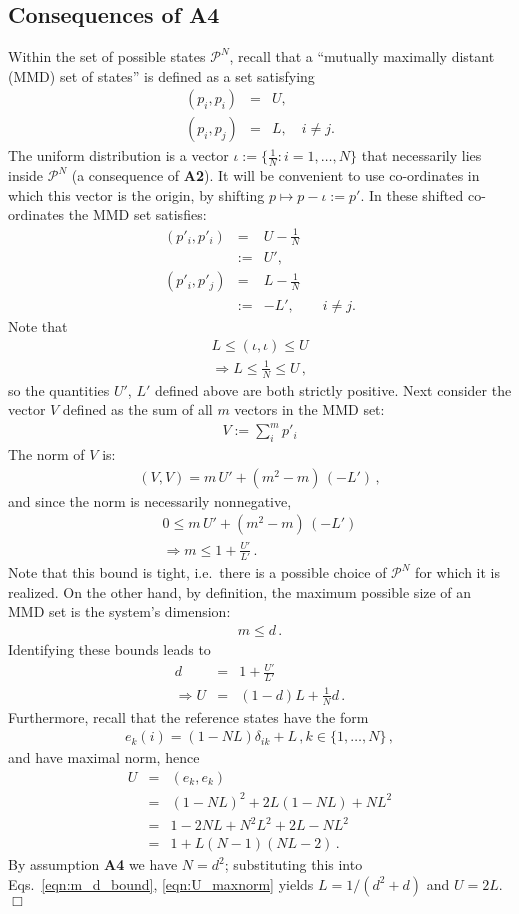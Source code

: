 \documentclass[%
 reprint,superscriptaddress,
 amsmath,amssymb,
 aps,twocolumn,pra
]{revtex4-1}
\newcommand{\eqn}[1]{\begin{eqnarray} #1 \end{eqnarray}}
\newcommand{\zum}[2]{\displaystyle\sum_{#1}^{#2}}
\begin{document}
\begin{appendix}
\section{Consequences of {\bf A4} \label{app:vitality4}}
Within the set of possible states $\mathcal{P}^N$, recall that a ``mutually maximally distant (MMD) set of states'' is defined as a set satisfying
\eqn{
(p_i, p_i) &=& U, \nonumber \\
(p_i, p_j) &=& L,  \quad  i \neq j.
}
The uniform distribution is a vector $\iota := \{\frac{1}{N} : i=1,\dots,N \}$ that necessarily lies inside $\mathcal{P}^N$ (a consequence of {\bf A2}). It will be convenient to use co-ordinates in which this vector is the origin, by shifting $p \mapsto p-\iota := p'$. In these shifted co-ordinates the MMD set satisfies:
\eqn{
(p'_i, p'_i) &=& U-\frac{1}{N} \nonumber \\
&:=& U', \nonumber \\
(p'_i, p'_j) &=& L-\frac{1}{N} \nonumber \\
&:=& -L',  \qquad  i \neq j.
}
Note that
\eqn{
L \leq (\iota,\iota) \leq U \nonumber \\
\Rightarrow L \leq \frac{1}{N} \leq U \, ,
}
so the quantities $U'$, $L'$ defined above are both strictly positive. Next consider the vector $V$ defined as the sum of all $m$ vectors in the MMD set:
\eqn{
V := \zum{i}{m} p'_i
}
The norm of $V$ is:
\eqn{ \label{eqn:normV}
(V,V) = m\, U'+(m^2-m)\, (-L') \, ,
}
and since the norm is necessarily nonnegative,
\eqn{ \label{eqn:mmd_ineq}
0 \leq m\, U'+(m^2-m)\, (-L') \nonumber \\
\Rightarrow m \leq 1+\frac{U'}{L'} \, .
}
Note that this bound is tight, i.e.\ there is a possible choice of $\mathcal{P}^N$ for which it is realized. On the other hand, by definition, the maximum possible size of an MMD set is the system's dimension:
\eqn{ \label{eqn:mmd_ineq_d}
m \leq d \, .
}
Identifying these bounds leads to
\eqn{ \label{eqn:m_d_bound}
d &=& 1+\frac{U'}{L'} \, \nonumber \\
\Rightarrow U &=& (1-d)L+\frac{1}{N}d \, .
}
Furthermore, recall that the reference states have the form
\eqn{
e_k(i) = (1-NL)\delta_{ik} + L \, , k \in \{1,\dots, N\} \, ,
}
and have maximal norm, hence
\eqn{ \label{eqn:U_maxnorm}
U &=& (e_k, e_k) \nonumber \\
&=& (1-NL)^2 + 2L(1-NL) +NL^2 \nonumber \\
&=& 1-2NL+N^2L^2+2L-NL^2 \nonumber \\
&=& 1+L(N-1)(NL-2) \, .
}
By assumption {\bf A4} we have $N=d^2$; substituting this into Eqs.\ \eqref{eqn:m_d_bound}, \eqref{eqn:U_maxnorm} yields $L = 1/(d^2+d)$ and $U = 2L$. $\Box$


\end{appendix}
\end{document}
